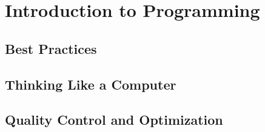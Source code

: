 \part{Introduction to Programming}

\chapter{Best Practices}




\chapter{Thinking Like a Computer}





\chapter{Quality Control and Optimization}


